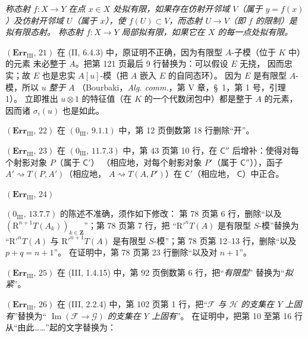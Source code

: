 \documentclass[UTF8,fontset=none,11pt,oneside,openany]{ctexbook}
\begin{document}
\emph{称态射 $f:X\to Y$ 在点 $x\in X$ 处拟有限，如果存在仿射开邻域
$V$（属于 $y=f(x)$）及仿射开邻域 $U$（属于 $x$），使
$f(U)\subset V$，而态射 $U\to V$（即 $f$ 的限制）是拟有限态射。
称态射 $f:X\to Y$ 局部拟有限，如果它在 $X$ 的每一点处拟有限。}

\noindent\textbf{$(\mathbf{Err}_{\mathrm{III}},\,21)$} 在
(II, 6.4.3) 中，原证明不正确，因为有限型 $A$-子模（位于 $K$ 中）的元素
未必整于 $A$。把第 121 页最后 9 行替换为：可以假设 $E$ 无挠，
因而忠实；故 $E$ 也是忠实 $A[u]$-模（把 $A$ 嵌入 $E$ 的自同态环）。
因为 $E$ 是有限型 $A$-模，所以 $u$ \emph{整于} $A$
（Bourbaki，\emph{Alg. comm.}，第 V 章，\S~1，第 1 号，引理 1）。
立即推出 $u\otimes1$ 的特征值（在 $K$ 的一个代数闭包中）都是整于
$A$ 的元素，因而诸 $\sigma_i(u)$ 也是如此。

\noindent\textbf{$(\mathbf{Err}_{\mathrm{III}},\,22)$} 在
$(0_{\mathrm{III}},\,9.1.1)$ 中，第 12 页倒数第 18 行删除“开”。

\noindent\textbf{$(\mathbf{Err}_{\mathrm{III}},\,23)$} 在
$(0_{\mathrm{III}},\,11.7.3)$ 中，第 43 页第 10 行，在
$\mathsf C''$ 后增补：使得对每个射影对象 $P$（属于 $\mathsf C'$）
（相应地，对每个射影对象 $P'$（属于 $\mathsf C''$）），函子
$A'\rightsquigarrow T(P,A')$（相应地，
$A\rightsquigarrow T(A,P')$）在 $\mathsf C'$（相应地，
$\mathsf C$）中正合。

\noindent\textbf{$(\mathbf{Err}_{\mathrm{III}},\,24)$}\par
\noindent
$(0_{\mathrm{III}},\,13.7.7)$ 的陈述不准确，须作如下修改：
第 78 页第 6 行，删除“以及
$(\mathrm R^{n+1}T(A_k))_{k\in\mathbf Z}$”；第 78 页第 7 行，把
“$\mathrm R'^nT(A)$ 是有限型 $S$-模”替换为
“$\mathrm R'^nT(A)$ 与 $\mathrm R'^{n+1}T(A)$ 是有限型
$S$-模”；第 78 页第 12--13 行，删除“以及 $p+q=n+1$”。
在证明中，第 78 页第 23 行删除“以及对 $n+1$”。

\noindent\textbf{$(\mathbf{Err}_{\mathrm{III}},\,25)$} 在
(III, 1.4.15) 中，第 92 页倒数第 6 行，把“\emph{有限型}”
替换为“\emph{拟紧}”。

\noindent\textbf{$(\mathbf{Err}_{\mathrm{III}},\,26)$} 在
(III, 2.2.4) 中，第 102 页第 1 行，把“\emph{$\mathscr F$ 与
$\mathscr H$ 的支集在 $Y$ 上固有}”替换为“\emph{
$\operatorname{Im}(\mathscr F\to\mathscr G)$ 的支集在 $Y$ 上固有}”。
在证明中，把第 10 至第 16 行从“由此……”起的文字替换为：
\end{document}
